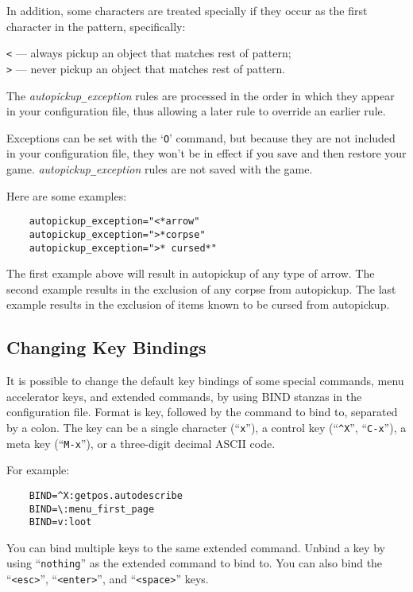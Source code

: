 In addition, some characters are treated specially if they occur as the first
character in the pattern, specifically:

{\tt <} --- always pickup an object that matches rest of pattern;\\
{\tt >} --- never pickup an object that matches rest of pattern.

The {\it autopickup\verb+_+exception\/} rules are processed in the order
in which they appear in your configuration file, thus allowing a
later rule to override an earlier rule.

Exceptions can be set with the `{\tt O}' command, but because they are not
included in your configuration file, they won't be in effect if you save
and then restore your game.
{\it autopickup\verb+_+exception\/} rules are not saved with the game.
\elist

Here are some examples:
\begin{verbatim}
    autopickup_exception="<*arrow"
    autopickup_exception=">*corpse"
    autopickup_exception=">* cursed*"
\end{verbatim}

The first example above will result in autopickup of any type of arrow.
The second example results in the exclusion of any corpse from autopickup.
The last example results in the exclusion of items known to be cursed from
autopickup.


\subsection*{Changing Key Bindings}

It is possible to change the default key bindings of some special commands,
menu accelerator keys, and extended commands, by using BIND stanzas in the
configuration file. Format is key, followed by the command to bind to,
separated by a colon. The key can be a single character (``{\tt x}''),
a control key (``{\tt \^{}X}'', ``{\tt C-x}''), a meta key (``{\tt M-x}''),
or a three-digit decimal ASCII code.

For example:

\begin{verbatim}
    BIND=^X:getpos.autodescribe
    BIND=\:menu_first_page
    BIND=v:loot
\end{verbatim}

\blist{}
\item[\tb{Extended command keys}]
You can bind multiple keys to the same extended command. Unbind a key by
using ``{\tt nothing}'' as the extended command to bind to. You can also bind
the ``{\tt <esc>}'', ``{\tt <enter>}'', and ``{\tt <space>}'' keys.

